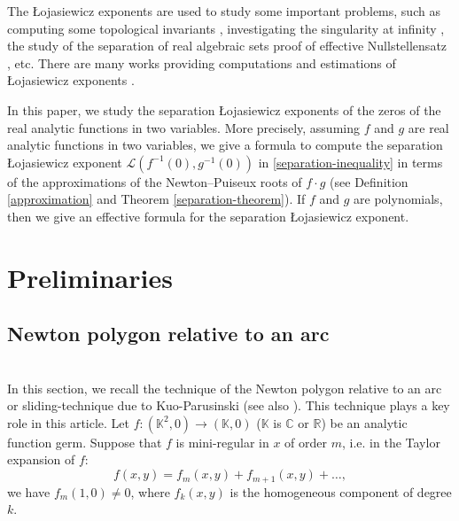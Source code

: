 \documentclass[reqno, 12pt ,a4letter]{amsart}
\theoremstyle{definition}
\begin{document}
The \L ojasiewicz exponents are used to study some important problems, such as computing some topological invariants \cite{Nguyen2019,Risler1997,Teissier1977}, investigating the singularity at infinity \cite{Ha1990}, the study of the separation of real algebraic sets \cite{Cygan1999,Kurdyka2014} proof of effective Nullstellensatz \cite{Jelonek2005,Ji1992}, etc. There are many works providing computations and estimations of \L ojasiewicz exponents \cite{Gwozdziewicz1999,HD08,HD10,Acunto2005,Kurdyka2014,Nguyen2019,Pham2012}. 

In this paper, we study the separation \L ojasiewicz exponents of the zeros of the real analytic functions in two variables. More precisely, assuming $f$ and $g$ are real analytic functions in two variables, we give a formula to compute the separation \L ojasiewicz exponent $\mathscr{L}(f^{-1}(0),g^{-1}(0))$ in \eqref{separation-inequality} in terms of the approximations of the Newton--Puiseux roots of $f\cdot g$ (see Definition \ref{approximation} and Theorem \ref{separation-theorem}). If $f$ and $g$ are polynomials, then we give an effective formula for the separation \L ojasiewicz exponent. 


\section{Preliminaries} \label{Section2}

\subsection{Newton polygon relative to an arc}\label{subsection-key-lemmas}\quad\\
In this section, we recall the technique of the Newton polygon relative to an arc or sliding-technique due to Kuo-Parusinski \cite{Kuo2000} (see also \cite{HD10}). This technique plays a key role in this article. Let $f: (\mathbb{K}^2,0) \to (\mathbb{K},0)$ ($\mathbb{K}$ is $\mathbb{C}$ or $\mathbb{R}$) be an analytic function germ. Suppose that $f$ is mini-regular in $x$ of order $m$, i.e. in the Taylor expansion of $f$: $$ f(x,y) = f_m(x,y) + f_{m+1}(x,y) + \dots, $$ we have $f_m(1,0) \ne 0$, where $f_k(x,y)$ is the homogeneous component of degree $k$. 
\end{document}
